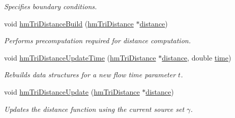 \begin{DoxyCompactItemize}
\begin{DoxyCompactList}\small\item\em Specifies boundary conditions. \end{DoxyCompactList}\item 
void \hyperlink{structhm_tri_distance_a681250be3575802920a769e15cd6b102}{hm\-Tri\-Distance\-Build} (\hyperlink{structhm_tri_distance}{hm\-Tri\-Distance} $\ast$\hyperlink{structhm_tri_distance_a6a9fc819eb7899fe7efd9203a89ce059}{distance})
\begin{DoxyCompactList}\small\item\em Performs precomputation required for distance computation. \end{DoxyCompactList}\item 
void \hyperlink{structhm_tri_distance_a7c0c446b080b5ee164c2494650b12590}{hm\-Tri\-Distance\-Update\-Time} (\hyperlink{structhm_tri_distance}{hm\-Tri\-Distance} $\ast$\hyperlink{structhm_tri_distance_a6a9fc819eb7899fe7efd9203a89ce059}{distance}, double \hyperlink{structhm_tri_distance_ab2d5aa7fce1a14d8bddfb2c333ea9679}{time})
\begin{DoxyCompactList}\small\item\em Rebuilds data structures for a new flow time parameter $t$. \end{DoxyCompactList}\item 
void \hyperlink{structhm_tri_distance_aa5107690159127c6715c85fd5847871b}{hm\-Tri\-Distance\-Update} (\hyperlink{structhm_tri_distance}{hm\-Tri\-Distance} $\ast$\hyperlink{structhm_tri_distance_a6a9fc819eb7899fe7efd9203a89ce059}{distance})
\begin{DoxyCompactList}\small\item\em Updates the distance function using the current source set $\gamma$. \end{DoxyCompactList}\end{DoxyCompactItemize}
